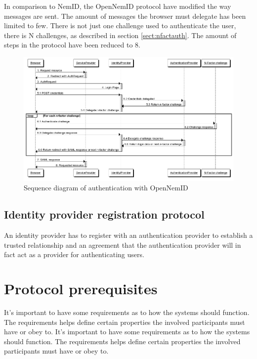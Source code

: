 \documentclass[twosided]{report}
\begin{document}
In comparison to NemID, the OpenNemID protocol have modified the way messages are sent. The amount of messages the browser must delegate has been limited to few. There is not just one challenge used to authenticate the user, there is N challenges, as described in section \ref{sect:nfactauth}. The amount of steps in the protocol have been reduced to 8.

\begin{figure}[H]
	\centering
	\includegraphics[scale=0.4]{images/Open-NemId-(User-Login).png}
	\caption{Sequence diagram of authentication with OpenNemID}
\end{figure}

\subsection{Identity provider registration protocol}
An identity provider has to register with an authentication provider to establish a trusted relationship and an agreement that the authentication provider will in fact act as a provider for authenticating users.

\section{Protocol prerequisites}
It's important to have some requirements as to how the systems should function. The requirements helps define certain properties the involved participants must have or obey to.
It's important to have some requirements as to how the systems should function. The requirements helps define certain properties the involved participants must have or obey to.
\end{document}
